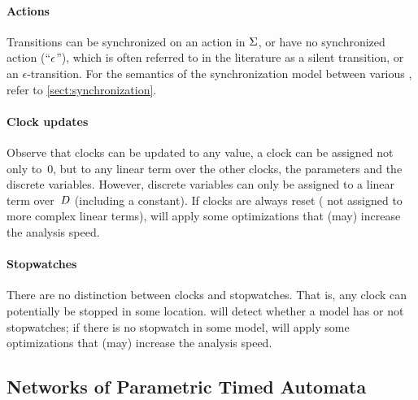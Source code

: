 \paragraph{Actions}
Transitions can be synchronized on an action in $\Sigma$, or have no synchronized action (``$\epsilon$''), which is often referred to in the literature as a silent transition, or an $\epsilon$-transition.
For the semantics of the synchronization model between various \IPTA{}, refer to \cref{sect:synchronization}.

\paragraph{Clock updates}
Observe that clocks can be updated to any value, \ie{} a clock can be assigned not only to~0, but to any linear term over the other clocks, the parameters and the discrete variables.
However, discrete variables can only be assigned to a linear term over~$D$ (including a constant).
If clocks are always reset (\ie{} not assigned to more complex linear terms), \imitator{} will apply some optimizations that (may) increase the analysis speed.

\paragraph{Stopwatches}
There are no distinction between clocks and stopwatches.
That is, any clock can potentially be stopped in some location.
\imitator{} will detect whether a model has or not stopwatches; if there is no stopwatch in some model, \imitator{} will apply some optimizations that (may) increase the analysis speed.


\subsection{Networks of \imitator{} Parametric Timed Automata}

